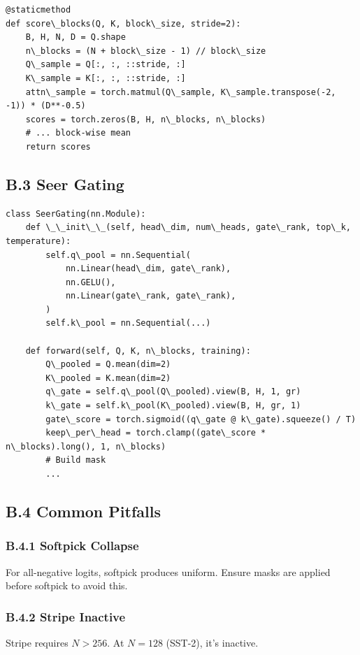 \begin{lstlisting}
@staticmethod
def score\_blocks(Q, K, block\_size, stride=2):
    B, H, N, D = Q.shape
    n\_blocks = (N + block\_size - 1) // block\_size
    Q\_sample = Q[:, :, ::stride, :]
    K\_sample = K[:, :, ::stride, :]
    attn\_sample = torch.matmul(Q\_sample, K\_sample.transpose(-2, -1)) * (D**-0.5)
    scores = torch.zeros(B, H, n\_blocks, n\_blocks)
    # ... block-wise mean
    return scores
\end{lstlisting}

\subsection{B.3 Seer Gating}

\begin{lstlisting}
class SeerGating(nn.Module):
    def \_\_init\_\_(self, head\_dim, num\_heads, gate\_rank, top\_k, temperature):
        self.q\_pool = nn.Sequential(
            nn.Linear(head\_dim, gate\_rank),
            nn.GELU(),
            nn.Linear(gate\_rank, gate\_rank),
        )
        self.k\_pool = nn.Sequential(...)
    
    def forward(self, Q, K, n\_blocks, training):
        Q\_pooled = Q.mean(dim=2)
        K\_pooled = K.mean(dim=2)
        q\_gate = self.q\_pool(Q\_pooled).view(B, H, 1, gr)
        k\_gate = self.k\_pool(K\_pooled).view(B, H, gr, 1)
        gate\_score = torch.sigmoid((q\_gate @ k\_gate).squeeze() / T)
        keep\_per\_head = torch.clamp((gate\_score * n\_blocks).long(), 1, n\_blocks)
        # Build mask
        ...
\end{lstlisting}

\subsection{B.4 Common Pitfalls}

\subsubsection{B.4.1 Softpick Collapse}

For all-negative logits, softpick produces uniform. Ensure masks are applied 
before softpick to avoid this.

\subsubsection{B.4.2 Stripe Inactive}

Stripe requires $N > 256$. At $N = 128$ (SST-2), it's inactive.

